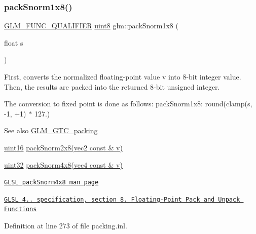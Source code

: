 \mbox{\label{group__gtc__packing_ga26b6cd7a35c46c4b6a342f3b97b47423}} 
\subsubsection{\texorpdfstring{pack\+Snorm1x8()}{packSnorm1x8()}}
{\footnotesize\ttfamily \hyperlink{setup_8hpp_a33fdea6f91c5f834105f7415e2a64407}{G\+L\+M\+\_\+\+F\+U\+N\+C\+\_\+\+Q\+U\+A\+L\+I\+F\+I\+ER} \hyperlink{group__gtc__type__precision_ga1a7dcd8aac97cc8020817c94049deff2}{uint8} glm\+::pack\+Snorm1x8 (\begin{DoxyParamCaption}\item[{float}]{s }\end{DoxyParamCaption})}

First, converts the normalized floating-\/point value v into 8-\/bit integer value. Then, the results are packed into the returned 8-\/bit unsigned integer.

The conversion to fixed point is done as follows\+: pack\+Snorm1x8\+: round(clamp(s, -\/1, +1) $\ast$ 127.)

\begin{DoxySeeAlso}{See also}
\hyperlink{group__gtc__packing}{G\+L\+M\+\_\+\+G\+T\+C\+\_\+packing} 

\hyperlink{group__gtc__type__precision_gad8c2939e1fdd8e5828b31d95c52255d5}{uint16} \hyperlink{group__gtc__packing_ga05d08a82923166ec7cd5d0e6154c9953}{pack\+Snorm2x8(vec2 const \& v)} 

\hyperlink{group__gtc__type__precision_ga202b6a53c105fcb7e531f9b443518451}{uint32} \hyperlink{group__core__func__packing_gafcf25acc0d361c6c696a433aa5dfd16b}{pack\+Snorm4x8(vec4 const \& v)} 

\href{http://www.opengl.org/sdk/docs/manglsl/xhtml/packSnorm4x8.xml}{\tt G\+L\+SL pack\+Snorm4x8 man page} 

\href{http://www.opengl.org/registry/doc/GLSLangSpec.4.20.8.pdf}{\tt G\+L\+SL 4.. specification, section 8. Floating-\/\+Point Pack and Unpack Functions} 
\end{DoxySeeAlso}


Definition at line 273 of file packing.\+inl.

\mbox{\label{group__gtc__packing_ga05d08a82923166ec7cd5d0e6154c9953}} 
